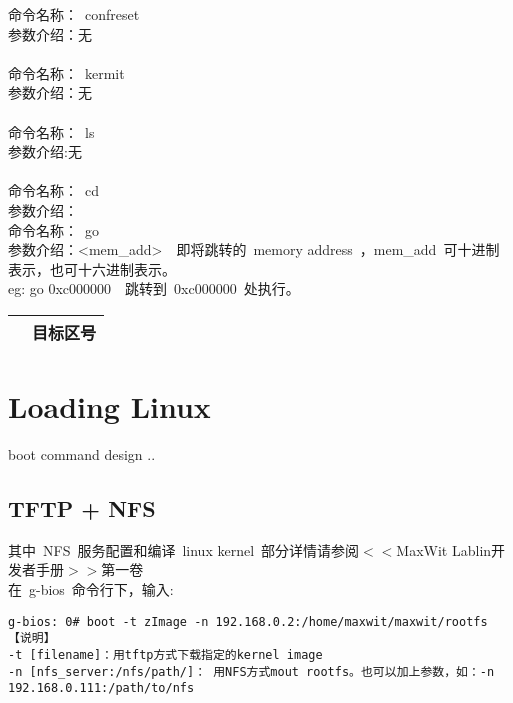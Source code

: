 \noindent 命令名称：~confreset~\\
参数介绍：无\\
\\
\noindent 命令名称：~kermit~\\
参数介绍：无\\
\\
\noindent 命令名称：~ls~\\
参数介绍:无\\
\\
\noindent 命令名称：~cd~\\
参数介绍：\\

\noindent 命令名称：~go~ \\
参数介绍：<mem\_add>　即将跳转的~memory address~，mem\_add~可十进制表示，也可十六进制表示。
\\eg: go 0xc000000　跳转到~0xc000000~处执行。
\begin{table}[htbp]
\setlength{\parindent}{0pt}
\begin{tabular}{|c|c|}
\hline
[~N~] & 目标区号\\
\hline
\end{tabular}
\end{table}

\chapter{Loading Linux}

%
%

boot command design ..

\section{TFTP + NFS}

\indent 其中~NFS~服务配置和编译~linux kernel~部分详情请参阅$<<$MaxWit Lablin开发者手册$>>$第一卷\\
\indent 在~g-bios~命令行下，输入:\\

\begin{verbatim}
g-bios: 0# boot -t zImage -n 192.168.0.2:/home/maxwit/maxwit/rootfs
【说明】
-t [filename]：用tftp方式下载指定的kernel image
-n [nfs_server:/nfs/path/]： 用NFS方式mout rootfs。也可以加上参数，如：-n 192.168.0.111:/path/to/nfs
\end{verbatim}

